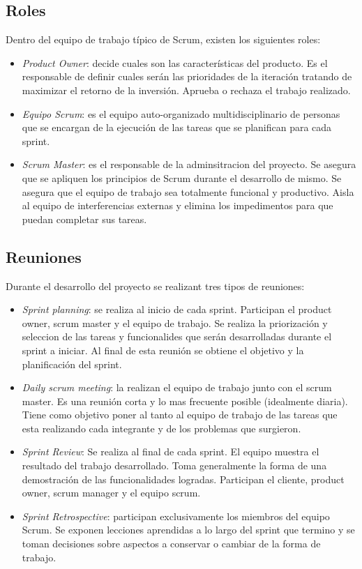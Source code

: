 \documentclass[12pt,a4paper]{article}
\begin{document}
	\subsection{Roles}

	Dentro del equipo de trabajo típico de Scrum, existen los siguientes roles:
	
	\begin{itemize}
	\item \textit{Product Owner}: decide cuales son las características del producto. Es el responsable de definir cuales serán las prioridades de la iteración tratando de maximizar el retorno de la inversión. Aprueba o rechaza el trabajo realizado.

	\item \textit{Equipo Scrum}: es el equipo auto-organizado multidisciplinario de personas que se encargan de la ejecución de las tareas que se planifican para cada sprint.

	\item \textit{Scrum Master}: es el responsable de la adminsitracion del proyecto. Se asegura que se apliquen los principios de Scrum durante el desarrollo de mismo. Se asegura que el equipo de trabajo sea totalmente funcional y productivo. Aisla al equipo de interferencias externas y elimina los impedimentos para que puedan completar sus tareas.
	
	\end{itemize}

	\subsection{Reuniones}
	Durante el desarrollo del proyecto se realizant tres tipos de reuniones:

	\begin{itemize}
	\item \textit{Sprint planning}: se realiza al inicio de cada sprint. Participan el product owner, scrum master y el equipo de trabajo. Se realiza la priorización y seleccion de las tareas y funcionalides que serán desarrolladas durante el sprint a iniciar. Al final de esta reunión se obtiene el objetivo y la planificación del sprint.

	\item \textit{Daily scrum meeting}: la realizan el equipo de trabajo junto con el scrum master. Es una reunión corta y lo mas frecuente posible (idealmente diaria).  Tiene como objetivo poner al tanto al equipo de trabajo de las tareas que esta realizando cada integrante y de los problemas que surgieron.

	\item \textit{Sprint Review}: Se realiza al final de cada sprint. El equipo muestra el resultado del trabajo desarrollado. Toma generalmente la forma de una demostración de las funcionalidades logradas. Participan el cliente, product owner, scrum manager y el equipo scrum.

	\item \textit{Sprint Retrospective}: participan exclusivamente los miembros del equipo Scrum. Se exponen lecciones aprendidas a lo largo del sprint que termino y se toman decisiones sobre aspectos a conservar o cambiar de la forma de trabajo.
	\end{itemize}
\end{document}
